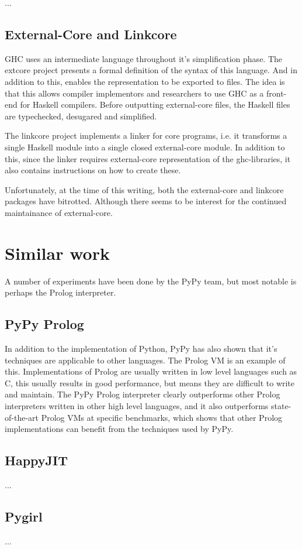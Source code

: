 ...
\cite{marlow2012glasgow}

\subsection{External-Core and Linkcore}

GHC uses an intermediate language throughout it's 
simplification phase. The extcore project presents a formal definition of the syntax 
of this language. And in addition to this, enables the representation to be exported 
to files. The idea is that this allows compiler implementors and researchers to use GHC
as a front-end for Haskell compilers. Before outputting external-core files,
the Haskell files are typechecked, desugared and simplified. \cite{tolmach2010ghc}

The linkcore project implements a linker for core programs, i.e. it transforms
a single Haskell module into a single closed external-core module. In addition to
this, since the linker requires external-core representation of the ghc-libraries,
it also contains instructions on how to create these. 

Unfortunately, at the time of this writing, both the external-core and linkcore 
packages have bitrotted. Although there seems to be interest for the continued 
maintainance of external-core.

\section{Similar work}

A number of experiments have been done by the PyPy team, but most notable is perhaps
the Prolog interpreter. 

\subsection{PyPy Prolog}

In addition to the implementation of Python, PyPy has also shown that it's techniques
are applicable to other languages. The Prolog VM is an example of this. Implementations
of Prolog are usually written in low level languages such as C, this usually results in
good performance, but means they are difficult to write and maintain. The PyPy Prolog 
interpreter clearly outperforms other Prolog interpreters written in other high level
languages, and it also outperforms state-of-the-art Prolog VMs at specific benchmarks,
which shows that other Prolog implementations can benefit from the techniques used by
PyPy. \cite{bolz2010towards}


\subsection{HappyJIT}

...

\subsection{Pygirl}

...



